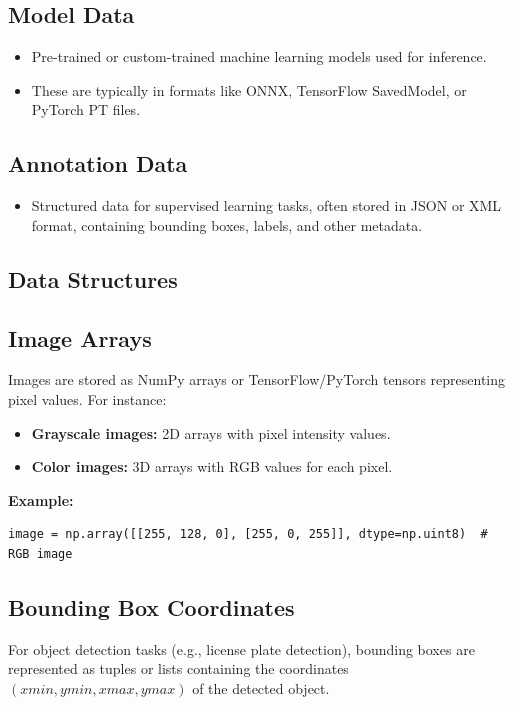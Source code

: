 \subsection*{Model Data}
\begin{itemize}[leftmargin=1.5cm]
	\item Pre-trained or custom-trained machine learning models used for inference.
	\item These are typically in formats like ONNX, TensorFlow SavedModel, or PyTorch PT files.
\end{itemize}

\subsection*{Annotation Data}
\begin{itemize}[leftmargin=1.5cm]
	\item Structured data for supervised learning tasks, often stored in JSON or XML format, containing bounding boxes, labels, and other metadata. \cite{PIJ:2020}
\end{itemize}

\subsection{Data Structures}

\subsection*{Image Arrays}
Images are stored as NumPy arrays or TensorFlow/PyTorch tensors representing pixel values. For instance:
\begin{itemize}
	\item \textbf{Grayscale images:} 2D arrays with pixel intensity values.
	\item \textbf{Color images:} 3D arrays with RGB values for each pixel.
\end{itemize}

\textbf{Example:}
\begin{lstlisting}[style=python]
	image = np.array([[255, 128, 0], [255, 0, 255]], dtype=np.uint8)  # RGB image
\end{lstlisting}

\subsection*{Bounding Box Coordinates}
For object detection tasks (e.g., license plate detection), bounding boxes are represented as tuples or lists containing the coordinates $(xmin, ymin, xmax, ymax)$ of the detected object.

